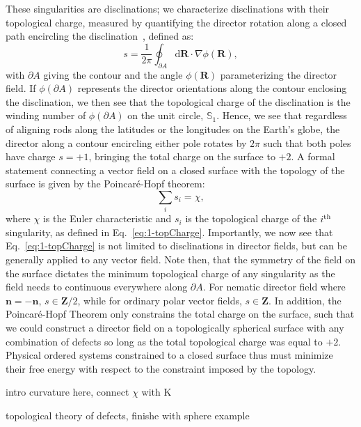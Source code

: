 These singularities are disclinations; we characterize disclinations with their topological charge, measured by quantifying the director rotation along a closed path encircling the disclination~\cite{RN23,RN153,RN203}, defined as:
\begin{equation}
  s = \frac{1}{2 \pi}\oint_{\partial A} \textrm{d}\mathbf{R} \cdot \nabla\phi(\mathbf{R}),\label{eq:1-topCharge}
\end{equation}
with $\partial A$ giving the contour and the angle $\phi(\mathbf{R})$ parameterizing the director field.
If $\phi(\partial A)$ represents the director orientations along the contour enclosing the disclination, we then see that the topological charge of the disclination is the winding number of $\phi(\partial A)$ on the unit circle, $\mathbb{S}_1$.
Hence, we see that regardless of aligning rods along the latitudes or the longitudes on the Earth's globe, the director along a contour encircling either pole rotates by $2 \pi$ such that both poles have charge $s = +1$, bringing the total charge on the surface to $+2$.
A formal statement connecting a vector field on a closed surface with the topology of the surface is given by the Poincar\'e-Hopf theorem:
\begin{equation}
  \sum\limits_i s_i = \chi,\label{e:1-PH}
\end{equation}
where $\chi$ is the Euler characteristic and $s_i$ is the topological charge of the $i^{\rm th}$ singularity, as defined in Eq.~\ref{eq:1-topCharge}.
Importantly, we now see that Eq.~\ref{eq:1-topCharge} is not limited to disclinations in director fields, but can be generally applied to any vector field.
Note then, that the symmetry of the field on the surface dictates the minimum topological charge of any singularity as the field needs to continuous everywhere along $\partial A$.
For nematic director field where $\mathbf{n} = -\mathbf{n}$, $s \in \mathbf{Z}/2$, while for ordinary polar vector fields, $s \in \mathbf{Z}$.
In addition, the Poincar\'e-Hopf Theorem only constrains the total charge on the surface, such that we could construct a director field on a topologically spherical surface with any combination of defects so long as the total topological charge was equal to $+2$.
Physical ordered systems constrained to a closed surface thus must minimize their free energy with respect to the constraint imposed by the topology.

intro curvature here, connect $\chi$ with K

topological theory of defects, finishe with sphere example


